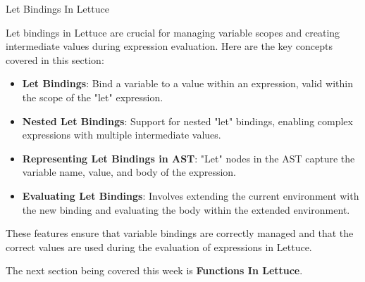 \begin{notes}{Let Bindings In Lettuce}
\begin{highlight}
    \end{highlight}
    
    \begin{highlight}
    
        Let bindings in Lettuce are crucial for managing variable scopes and creating intermediate values during expression evaluation. Here are the key concepts covered in this section:
    
        \begin{itemize}
            \item \textbf{Let Bindings}: Bind a variable to a value within an expression, valid within the scope of the "let" expression.
            \item \textbf{Nested Let Bindings}: Support for nested "let" bindings, enabling complex expressions with multiple intermediate values.
            \item \textbf{Representing Let Bindings in AST}: "Let" nodes in the AST capture the variable name, value, and body of the expression.
            \item \textbf{Evaluating Let Bindings}: Involves extending the current environment with the new binding and evaluating the body within the extended environment.
        \end{itemize}
        
        These features ensure that variable bindings are correctly managed and that the correct values are used during the evaluation of expressions in Lettuce.
    
    \end{highlight}
\end{notes}

The next section being covered this week is \textbf{Functions In Lettuce}.

